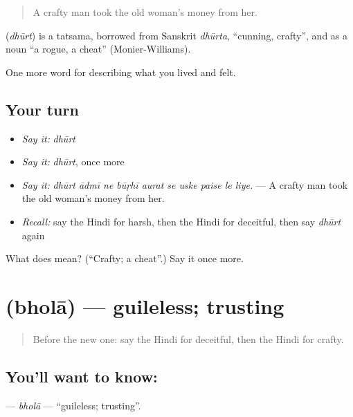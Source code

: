 \begin{quote}
A crafty man took the old woman's money from her.
\end{quote}

\begin{cousinweb}
\textbf{} (\emph{dhūrt}) is a tatsama, borrowed from Sanskrit \emph{dhūrta}, \textquotedblleft{}cunning, crafty\textquotedblright{}, and as a noun \textquotedblleft{}a rogue, a cheat\textquotedblright{} (Monier-Williams).
\end{cousinweb}

\begin{grammarlens}[title={What you've built}]
One more word for describing what you lived and felt.
\end{grammarlens}

\subsection*{Your turn}
\begin{itemize}
\raggedright
  \item \emph{Say it:} \emph{dhūrt}
  \item \emph{Say it:} \emph{dhūrt}, once more
  \item \emph{Say it:} \emph{dhūrt ādmī ne būṛhī aurat se uske paise le liye.} — A crafty man took the old woman's money from her.
  \item \emph{Recall:} say the Hindi for harsh, then the Hindi for deceitful, then say \emph{dhūrt} again
\end{itemize}

\begin{tcolorbox}[breakable,colback=teal!4,colframe=teal!35!black,title={Before you move on}]
What does  mean? (\textquotedblleft{}Crafty; a cheat\textquotedblright{}.) Say it once more.
\end{tcolorbox}
\section[\texorpdfstring{\hi{भोला} (bholā)}{भोला (bholā)}]{ (bholā) — guileless; trusting}

\label{lesson:HI-C467-bhola}



\begin{quote}
Before the new one: say the Hindi for deceitful, then the Hindi for crafty.
\end{quote}

\subsection*{You'll want to know: }
\textbf{} — \emph{bholā} — \textquotedblleft{}guileless; trusting\textquotedblright{}.

